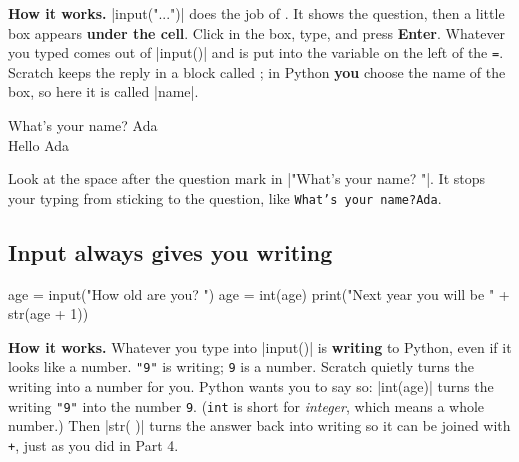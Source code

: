 \textbf{How it works.} \py|input("...")| does the job of . It shows the question, then a little box appears \textbf{under the cell}. Click in the box, type, and press \textbf{Enter}. Whatever you typed comes out of \py|input()| and is put into the variable on the left of the \texttt{=}. Scratch keeps the reply in a block called ; in Python \textbf{you} choose the name of the box, so here it is called \py|name|.

\begin{outputbox}
What's your name? Ada\\
Hello Ada
\end{outputbox}

\begin{think}
Look at the space after the question mark in \py|"What's your name? "|. It stops your typing from sticking to the question, like \texttt{What's your name?Ada}.
\end{think}

\subsection*{Input always gives you writing}

\begin{center}
\begin{scratch}
\end{scratch}
\end{center}
\vspace{-4pt}
\begin{code}
age = input("How old are you? ")
age = int(age)
print("Next year you will be " + str(age + 1))
\end{code}

\textbf{How it works.} Whatever you type into \py|input()| is \textbf{writing} to Python, even if it looks like a number. \texttt{"9"} is writing; \texttt{9} is a number. Scratch quietly turns the writing into a number for you. Python wants you to say so: \py|int(age)| turns the writing \texttt{"9"} into the number \texttt{9}. (\texttt{int} is short for \emph{integer}, which means a whole number.) Then \py|str( )| turns the answer back into writing so it can be joined with \texttt{+}, just as you did in Part 4.

